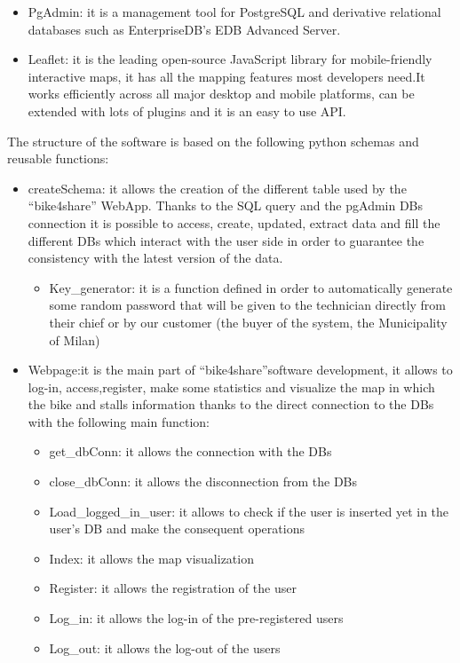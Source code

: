 \documentclass{article}
\begin{document}
\begin{itemize}
    \item PgAdmin: it is a management tool for PostgreSQL and derivative relational databases such as EnterpriseDB's EDB Advanced Server.
    \item Leaflet: it is the leading open-source JavaScript library for mobile-friendly interactive maps, it has all the mapping features most developers need.It works efficiently across all major desktop and mobile platforms, can be extended with lots of plugins and it is an easy to use  API. 
\end{itemize}
The structure of the software is based on the following python schemas and reusable functions:
\begin{itemize}
    \item createSchema: it allows the creation of the different table used by the  “bike4share” WebApp. Thanks to the SQL query and the pgAdmin DBs connection it is possible to access, create, updated, extract data and fill the different DBs which interact with the user side in order to guarantee the consistency with the latest version of the data.
    \begin{itemize}
         \item Key\_generator: it is a function defined in order to automatically generate some random password that will be given to the technician directly from their chief or by our customer (the buyer of the system, the Municipality of Milan)
    \end{itemize}
    \item Webpage:it is the main part of “bike4share”software development, it allows to log-in, access,register, make some statistics and visualize the map in which the bike and stalls information thanks to the direct connection to the DBs with the following main function:
     \begin{itemize}
         \item get\_dbConn: it allows the connection with the  DBs
         \item close\_dbConn: it allows the disconnection from the  DBs
         \item Load\_logged\_in\_user: it allows to check if the user is inserted yet in the user’s DB and make the consequent operations
         \item Index: it allows the map visualization
         \item Register: it allows the registration of the user
         \item Log\_in: it allows the log-in of the pre-registered users
         \item Log\_out: it allows the log-out of the users 

\end{itemize}
\end{itemize}
\end{document}
